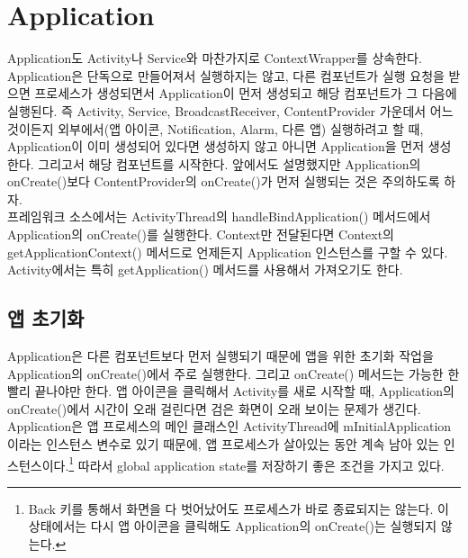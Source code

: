 \chapter{Application}
Application도 Activity나 Service와 마찬가지로 ContextWrapper를 상속한다.
Application은 단독으로 만들어져서 실행하지는 않고, 다른 컴포넌트가 실행 요청을 받으면 프로세스가 생성되면서 Application이 먼저 생성되고 해당 컴포넌트가 그 다음에 실행된다. 즉 Activity, Service, BroadcastReceiver, ContentProvider 가운데서 어느 것이든지 외부에서(앱 아이콘, Notification, Alarm, 다른 앱) 실행하려고 할 때, Application이 이미 생성되어 있다면 생성하지 않고 아니면 Application을 먼저 생성한다. 그리고서 해당 컴포넌트를 시작한다. 앞에서도 설명했지만 Application의 onCreate()보다 ContentProvider의 onCreate()가 먼저 실행되는 것은 주의하도록 하자.\\

프레임워크 소스에서는 ActivityThread의 handleBindApplication() 메서드에서 Application의 onCreate()를 실행한다.
Context만 전달된다면 Context의 getApplicationContext() 메서드로 언제든지 Application 인스턴스를 구할 수 있다. Activity에서는 특히 getApplication() 메서드를 사용해서 가져오기도 한다.

\section{앱 초기화}
Application은 다른 컴포넌트보다 먼저 실행되기 때문에 앱을 위한 초기화 작업을 Application의 onCreate()에서 주로 실행한다.
그리고 onCreate() 메서드는 가능한 한 빨리 끝나야만 한다. 
앱 아이콘을 클릭해서 Activity를 새로 시작할 때, Application의 onCreate()에서 시간이 오래 걸린다면 검은 화면이 오래 보이는 문제가 생긴다.\\

Application은 앱 프로세스의 메인 클래스인 ActivityThread에 mInitialApplication이라는 인스턴스 변수로 있기 때문에, 앱 프로세스가 살아있는 동안 계속 남아 있는 인스턴스이다.\footnote{Back 키를 통해서 화면을 다 벗어났어도 프로세스가 바로 종료되지는 않는다. 이 상태에서는 다시 앱 아이콘을 클릭해도 Application의 onCreate()는 실행되지 않는다.}
따라서 global application state를 저장하기 좋은 조건을 가지고 있다.\\

